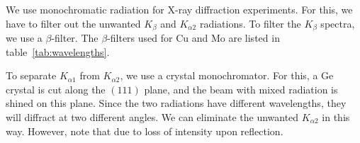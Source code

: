 	We use monochromatic radiation for X-ray diffraction experiments. For this, we have to filter out the unwanted $K_\beta$ and $K_{\alpha2}$ radiations. To filter the $K_\beta$ spectra, we use a $\beta$-filter. The  $\beta$-filters used for Cu and Mo are listed in table~\ref{tab:wavelengths}.
	
	To separate $K_{\alpha1}$ from $K_{\alpha2}$, we use a crystal monochromator. For this, a $\mathrm{Ge}$ crystal is cut along the $(111)$ plane, and the beam with mixed radiation is shined on this plane. Since the two radiations have different wavelengths, they will diffract at two different angles. We can eliminate the unwanted $K_{\alpha2}$ in this way. However, note that  due to loss of intensity upon reflection.